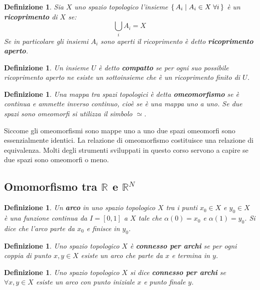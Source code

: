 \documentclass[10pt, twoside=false, x11names]{scrbook}
\newtheorem{definition}[theorem]{Definizione}
\newcommand{\RN}[1][]{\mathbb{R}^#1}
\begin{document}
\begin{definition}
  Sia $ X $ uno spazio topologico l'insieme $ \set{A_i | A_i \in X \; \forall i} $ è un \textbf{ricoprimento}
  di $ X $ se:
  \[
    \bigcup_{i} A_i = X
  \]
  Se in particolare gli insiemi $ A_i $ sono aperti il ricoprimento è detto \textbf{ricoprimento aperto}.
\end{definition}

\begin{definition}
  Un insieme $ U $ è detto \textbf{compatto} se per ogni suo possibile ricoprimento
  aperto ne esiste un sottoinsieme che è un ricoprimento \emph{finito} di $ U $.
\end{definition}

\begin{definition}
  Una mappa tra spazi topologici è detta \textbf{omeomorfismo} se è continua
  e ammette inverso continuo, cioè se è una mappa uno a uno. Se due spazi sono omeomorfi si utilizza
  il simbolo $ \simeq $.
\end{definition}
Siccome gli omeomorfismi sono mappe uno a uno due spazi omeomorfi sono essenzialmente identici. La
relazione di omeomorfismo costituisce una relazione di equivalenza. Molti
degli strumenti sviluppati in questo corso servono a capire se due spazi sono omeomorfi o meno.

\subsection{Omomorfismo tra $ \RN{} $ e $ \RN{N} $}

\begin{definition}
  Un \textbf{arco} in uno spazio topologico $ X $ tra i punti $ x_0 \in X $ e $ y_0 \in X $
  è una funzione continua da $ I = [0,1] $ a $ X $ tale che $ \alpha(0) = x_0 $ e $ \alpha(1) = y_0 $.
  Si dice che l'arco parte da $ x_0 $ e finisce in $ y_0 $.
\end{definition}

\begin{definition}
  Uno spazio topologico $ X $ è \textbf{connesso per archi} se per
  ogni coppia di punto $ x, y \in X $ esiste un arco che parte da $ x $ e termina in $ y $.
\end{definition}

\begin{definition}
  Uno spazio topologico $ X $ si dice \textbf{connesso per archi}  se $ \forall x, y \in X $ esiste
  un arco con punto iniziale $ x $ e punto finale $ y $.
\end{definition}
\end{document}
